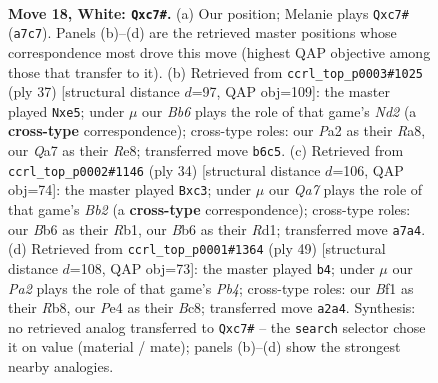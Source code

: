 \documentclass[11pt]{article}
\begin{document}
\clearpage

\begin{figure}[p]\centering
\begin{subfigure}{0.46\textwidth}\centering
\resizebox{\linewidth}{!}{%
\newchessgame
\chessboard[
  setfen={2kr3r/Q1p1bppp/1Bbpqn2/8/1P2P1P1/2N2P2/P1P4P/2KR1B1R w - - 3 18},
  showmover=false,
  pgfstyle=straightmove, color=movearrow, markmove={a7-c7}
]}
\caption{}
\end{subfigure}\hfill
\begin{subfigure}{0.46\textwidth}\centering
\resizebox{\linewidth}{!}{%
\newchessgame
\chessboard[
  setfen={r3r1k1/1bqn1pp1/pp5p/4N2n/3P3B/2PBQ3/P4PPP/1RR3K1 b - - 0 19},
  showmover=false,
  pgfstyle=straightmove, color=movearrow, markmove={d7-e5}
]}
\caption{}
\end{subfigure}
\\[4pt]
\begin{subfigure}{0.46\textwidth}\centering
\resizebox{\linewidth}{!}{%
\newchessgame
\chessboard[
  setfen={r2r2k1/1b3ppp/pp2p3/2b1q3/P1B3Q1/1Pn1P3/1B1N1PPP/1R1R2K1 w - - 6 18},
  showmover=false,
  pgfstyle=straightmove, color=movearrow, markmove={b2-c3}
]}
\caption{}
\end{subfigure}\hfill
\begin{subfigure}{0.46\textwidth}\centering
\resizebox{\linewidth}{!}{%
\newchessgame
\chessboard[
  setfen={1rb2r1k/p3b1p1/2q1p1Bp/1p1n2NQ/3p1P2/P7/1PP1N1PP/R4R1K b - - 1 25},
  showmover=false,
  pgfstyle=straightmove, color=movearrow, markmove={b5-b4}
]}
\caption{}
\end{subfigure}
\caption{\textbf{Move 18, White: \texttt{Qxc7\#}.} (a) Our position; Melanie plays \texttt{Qxc7\#} (\texttt{a7c7}). Panels (b)--(d) are the retrieved master positions whose correspondence most drove this move (highest QAP objective among those that transfer to it). (b) Retrieved from \texttt{ccrl\_top\_p0003\#1025} (ply 37) [structural distance $d$=97, QAP obj=109]: the master played \texttt{Nxe5}; under $\mu$ our \emph{Bb6} plays the role of that game's \emph{Nd2} (a \textbf{cross-type} correspondence); cross-type roles: our \emph{P}a2 as their \emph{R}a8, our \emph{Q}a7 as their \emph{R}e8; transferred move \texttt{b6c5}. (c) Retrieved from \texttt{ccrl\_top\_p0002\#1146} (ply 34) [structural distance $d$=106, QAP obj=74]: the master played \texttt{Bxc3}; under $\mu$ our \emph{Qa7} plays the role of that game's \emph{Bb2} (a \textbf{cross-type} correspondence); cross-type roles: our \emph{B}b6 as their \emph{R}b1, our \emph{B}b6 as their \emph{R}d1; transferred move \texttt{a7a4}. (d) Retrieved from \texttt{ccrl\_top\_p0001\#1364} (ply 49) [structural distance $d$=108, QAP obj=73]: the master played \texttt{b4}; under $\mu$ our \emph{Pa2} plays the role of that game's \emph{Pb4}; cross-type roles: our \emph{B}f1 as their \emph{R}b8, our \emph{P}e4 as their \emph{B}c8; transferred move \texttt{a2a4}. Synthesis: no retrieved analog transferred to \texttt{Qxc7\#} -- the \texttt{search} selector chose it on value (material / mate); panels (b)--(d) show the strongest nearby analogies.}
\label{fig:thought-m34}
\end{figure}
\end{document}
